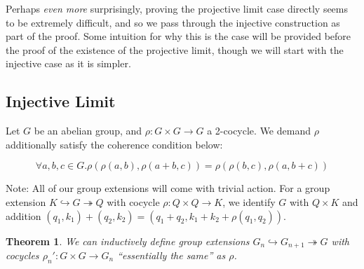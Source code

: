 \documentclass[12pt]{article}
\newtheorem{thm}{Theorem}
\theoremstyle{definition}
\newcommand{\mono}{\hookrightarrow}
\newcommand{\epi}{\twoheadrightarrow}
\begin{document}
  Perhaps \emph{even more} surprisingly, proving the projective limit case
  directly seems to be extremely difficult, and so we pass through the 
  injective construction as part of the proof. Some intuition for why this
  is the case will be provided before the proof of the existence of the 
  projective limit, though we will start with the injective case as it is simpler.

  \subsection{Injective Limit}

  Let $G$ be an abelian group, and $\rho : G \times G \to G$ a 2-cocycle.
  We demand $\rho$ additionally satisfy the coherence condition below:

  \[ 
    \forall a,b,c \in G. 
    \rho \left ( \rho(a,b), \rho(a+b,c) \right )
    = 
    \rho \left ( \rho(b,c), \rho(a,b+c) \right ) 
    \tag{$\star$}
  \]

  Note: All of our group extensions will come with trivial action.
  For a group extension $K \mono G \epi Q$ with cocycle 
  $\rho : Q \times Q \to K$, we identify $G$ with $Q \times K$
  and addition $(q_1,k_1) + (q_2,k_2) = (q_1 + q_2, k_1 + k_2 + \rho(q_1,q_2))$.

  \begin{thm}
    We can inductively define group extensions $G_n \mono G_{n+1} \epi G$
    with cocycles $\rho_n' : G \times G \to G_n$ ``essentially the same'' as 
    $\rho$.
  \end{thm}
\end{document}
